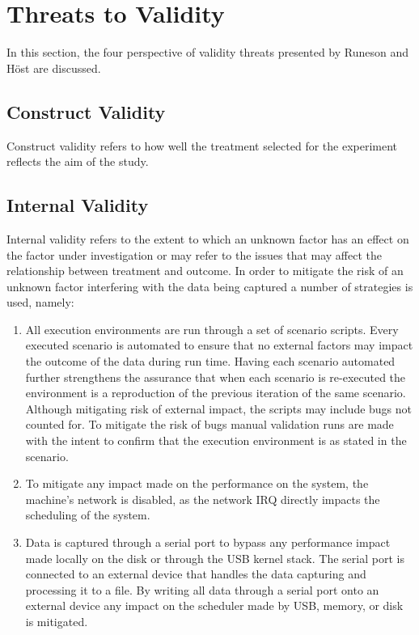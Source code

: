 \iffalse  \fi
\chapter{Threats to Validity}
In this section, the four perspective of validity threats presented by Runeson and H\"{o}st \cite{runeson} are discussed.

\section{Construct Validity}

Construct validity refers to how well the treatment selected for the experiment reflects the aim of the study.

\section{Internal Validity}
Internal validity refers to the extent to which an unknown factor has an effect on the factor under investigation or may refer to the issues that may affect the relationship between treatment and outcome. In order to mitigate the risk of an unknown factor interfering with the data being captured a number of strategies is used, namely: \\

\begin{enumerate}
\item{All execution environments are run through a set of scenario scripts. Every executed scenario is automated to ensure that no external factors may impact the outcome of the data during run time. Having each scenario automated further strengthens the assurance that when each scenario is re-executed the environment is a reproduction of the previous iteration of the same scenario. Although mitigating risk of external impact, the scripts may include bugs not counted for. To mitigate the risk of bugs manual validation runs are made with the intent to confirm that the execution environment is as stated in the scenario.}
\item{To mitigate any impact made on the performance on the system, the machine's network is disabled, as the network IRQ directly impacts the scheduling of the system.}
\item{Data is captured through a serial port to bypass any performance impact made locally on the disk or through the USB kernel stack. The serial port is connected to an external device that handles the data capturing and processing it to a file. By writing all data through a serial port onto an external device any impact on the scheduler made by USB, memory, or disk is mitigated.}
\end{enumerate}


